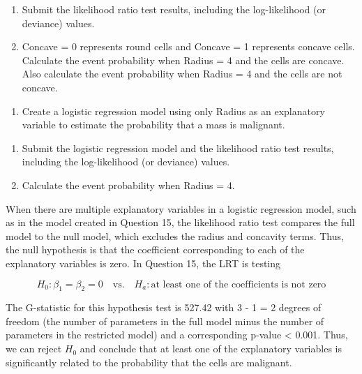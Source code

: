 \documentclass[
]{report}
\providecommand{\tightlist}{%
  \setlength{\itemsep}{0pt}\setlength{\parskip}{0pt}}
\begin{document}
\begin{enumerate}
\def\labelenumi{\alph{enumi}.}
\setcounter{enumi}{1}
\tightlist
\item
  Submit the likelihood ratio test results, including the log-likelihood (or deviance) values.\\
\item
  Concave = 0 represents round cells and Concave = 1 represents concave cells. Calculate the event probability when Radius = 4 and the cells are concave. Also calculate the event probability when Radius = 4 and the cells are not concave.
\end{enumerate}

\begin{enumerate}
\def\labelenumi{\arabic{enumi}.}
\setcounter{enumi}{15}
\tightlist
\item
  Create a logistic regression model using only Radius as an explanatory variable to estimate the probability that a mass is malignant.\\
\end{enumerate}

\begin{enumerate}
\def\labelenumi{\alph{enumi}.}
\tightlist
\item
  Submit the logistic regression model and the likelihood ratio test results, including the log-likelihood (or deviance) values.\\
\item
  Calculate the event probability when Radius = 4.
\end{enumerate}

When there are multiple explanatory variables in a logistic regression model, such as in the model created in Question 15, the likelihood ratio test compares the full model to the null model, which excludes the radius and concavity terms. Thus, the null hypothesis is that the coefficient corresponding to each of the explanatory variables is zero. In Question 15, the LRT is testing

\[H_0: \beta_1 = \beta_2 = 0 \quad \text{vs.}\quad H_a: \text{at least one of the coefficients is not zero}\]

The G-statistic for this hypothesis test is 527.42 with 3 - 1 = 2 degrees of freedom (the number of parameters in the full model minus the number of parameters in the restricted model) and a corresponding p-value \textless{} 0.001. Thus, we can reject \(H_0\) and conclude that at least one of the explanatory variables is significantly related to the probability that the cells are malignant.
\end{document}
